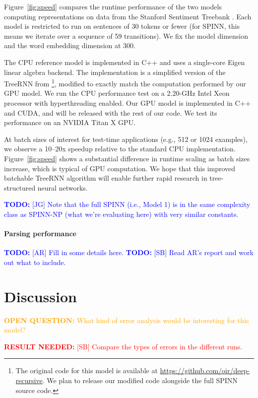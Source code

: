 \documentclass[11pt]{article}
\newcommand\todo[1]{\textcolor{blue}{\textbf{TODO:} #1}}
\newcommand\result[1]{\textcolor{red}{\textbf{RESULT NEEDED:} #1}}
\newcommand\question[1]{\textcolor{orange}{\textbf{OPEN QUESTION:} #1}}
\begin{document}
Figure~\ref{fig:speed} compares the runtime performance of the two models computing representations on data from the Stanford Sentiment Treebank \citep{socher2013recursive}. Each model is restricted to run on sentences of 30 tokens or fewer (for SPINN, this means we iterate over a sequence of 59 transitions). We fix the model dimension and the word embedding dimension at 300.

The CPU reference model is implemented in C++ and uses a single-core Eigen linear algebra backend. The implementation is a simplified version of the TreeRNN from \citet{irsoy2014deep}\footnote{The original code for this model is available at \url{https://github.com/oir/deep-recursive}. We plan to release our modified code alongside the full SPINN source code.}, modified to exactly match the computation performed by our GPU model. We run the CPU performance test on a 2.20-GHz Intel Xeon processor with hyperthreading enabled. Our GPU model is implemented in C++ and CUDA, and will be released with the rest of our code. We test its performance on an NVIDIA Titan X GPU.

At batch sizes of interest for test-time applications (e.g., 512 or 1024 examples), we observe a 10--20x speedup relative to the standard CPU implementation. Figure~\ref{fig:speed} shows a substantial difference in runtime scaling as batch sizes increase, which is typical of GPU computation. We hope that this improved batchable TreeRNN algorithm will enable further rapid research in tree-structured neural networks.

\todo{[JG] Note that the full SPINN (i.e., Model 1) is in the same complexity class as SPINN-NP (what we're evaluating here) with very similar constants.}

\paragraph{Parsing performance}

\todo{[AR] Fill in some details here.}
\todo{[SB] Read AR's report and work out what to include.}

\section{Discussion}

\question{What kind of error analysis would be interesting for this model?}

\result{[SB] Compare the types of errors in the different runs.}
\end{document}
